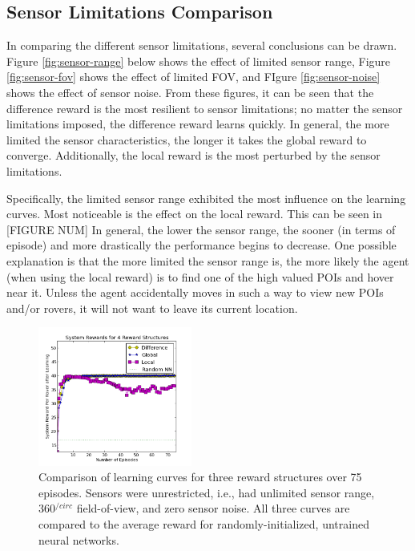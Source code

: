 \documentclass[letterpaper, 10 pt, conference]{ieeeconf}  %
\begin{document}
\subsection{Sensor Limitations Comparison}
In comparing the different sensor limitations, several conclusions can be drawn. Figure \ref{fig:sensor-range} below shows the effect of limited sensor range, Figure \ref{fig:sensor-fov} shows the effect of limited FOV, and FIgure \ref{fig:sensor-noise} shows the effect of sensor noise. From these figures, it can be seen that the difference reward is the most resilient to sensor limitations; no matter the sensor limitations imposed, the difference reward learns quickly. In general, the more limited the sensor characteristics, the longer it takes the global reward to converge. Additionally, the local reward is the most perturbed by the sensor limitations.

Specifically, the limited sensor range exhibited the most influence on the learning curves. Most noticeable is the effect on the local reward. This can be seen in [FIGURE NUM] In general, the lower the sensor range, the sooner (in terms of episode) and more drastically the performance begins to decrease. One possible explanation is that the more limited the sensor range is, the more likely the agent (when using the local reward) is to find one of the high valued POIs and hover near it. Unless the agent accidentally moves in such a way to view new POIs and/or rovers, it will not want to leave its current location.

\begin{figure}[h!]
    \centering
    \includegraphics[width=0.45\textwidth]{baseline.png}
    \caption{Comparison of learning curves for three reward structures over 75 episodes. Sensors were unrestricted, i.e., had unlimited sensor range, 360$^{/circ}$ field-of-view, and zero sensor noise. All three curves are compared to the average reward for randomly-initialized, untrained neural networks. }
    \label{fig:baseline}
\end{figure}
\end{document}
